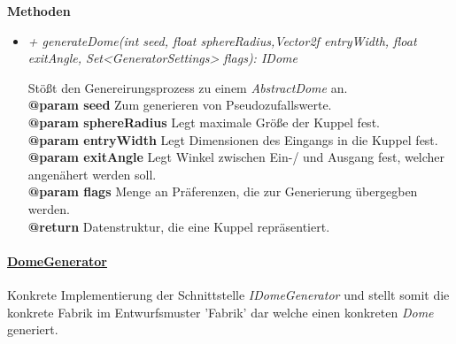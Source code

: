             \textbf{Methoden}					
            \begin{itemize}
                \item  \textit{+ generateDome(int seed, float sphereRadius,Vector2f entryWidth,
                                 float exitAngle, Set<GeneratorSettings> flags): IDome}
                    \begin{leftbar}[0.9\linewidth]
                        Stößt den Genereirungsprozess zu einem \textit{AbstractDome} an.\\
                        \textbf{@param seed} Zum generieren von Pseudozufallswerte.\\
                        \textbf{@param sphereRadius} Legt maximale Größe der Kuppel fest.\\
                        \textbf{@param entryWidth} Legt Dimensionen des Eingangs in die Kuppel fest.\\
                        \textbf{@param exitAngle} Legt Winkel zwischen Ein-/ und Ausgang fest, welcher angenähert
                            werden soll.\\
                        \textbf{@param flags} Menge an Präferenzen, die zur Generierung übergegben werden.\\
                        \textbf{@return} Datenstruktur, die eine Kuppel repräsentiert.
                    \end{leftbar}
            \end{itemize}


        \paragraph{\underline{DomeGenerator}} \mbox{}\par
            Konkrete Implementierung der Schnittstelle \textit{IDomeGenerator} und stellt somit die
            konkrete Fabrik im Entwurfsmuster 'Fabrik' dar welche einen konkreten \textit{Dome} generiert. \par
            
